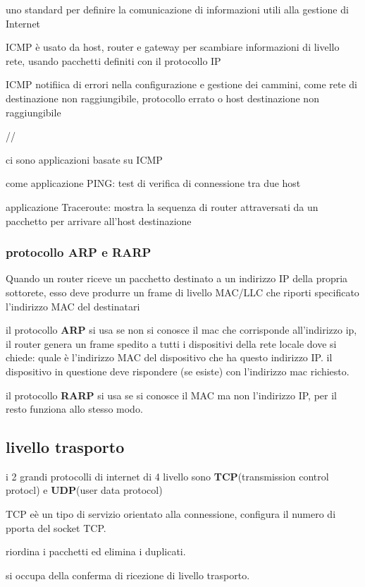 \documentclass[12pt]{article}
\begin{document}
uno standard per definire la comunicazione di informazioni utili alla gestione di Internet

ICMP è usato da host, router e gateway per scambiare informazioni di livello rete, usando
pacchetti definiti con il protocollo IP

ICMP notifiica di errori nella configurazione e gestione dei cammini, come rete di destinazione non raggiungibile, protocollo errato o host destinazione non raggiungibile

//

ci sono applicazioni basate su ICMP

come applicazione PING: test di verifica di connessione tra due host

applicazione Traceroute: mostra la sequenza di router attraversati da un pacchetto per
arrivare all'host destinazione



\subsubsection{protocollo ARP e RARP}

Quando un router riceve un pacchetto destinato a un indirizzo IP della propria sottorete, esso deve
produrre un frame di livello MAC/LLC che riporti specificato l'indirizzo MAC del destinatari

il protocollo \textbf{ARP} si usa se non si conosce il mac che corrisponde all'indirizzo ip, il router genera un frame spedito a tutti i dispositivi della rete locale dove si chiede:
quale è l'indirizzo MAC del dispositivo che ha questo indirizzo IP.
il dispositivo in questione deve rispondere (se esiste) con l'indirizzo mac richiesto.

il protocollo \textbf{RARP} si usa se si conosce il MAC ma non l'indirizzo IP, per il resto funziona allo stesso modo.


\subsection{livello trasporto}


i 2 grandi protocolli di internet di 4 livello sono \textbf{TCP}(transmission control protocl) e \textbf{UDP}(user data protocol) 

TCP eè un tipo di servizio orientato alla connessione, configura il numero di pporta del socket TCP.

riordina i pacchetti ed elimina i duplicati.

si occupa della conferma di ricezione di livello trasporto.
\end{document}
